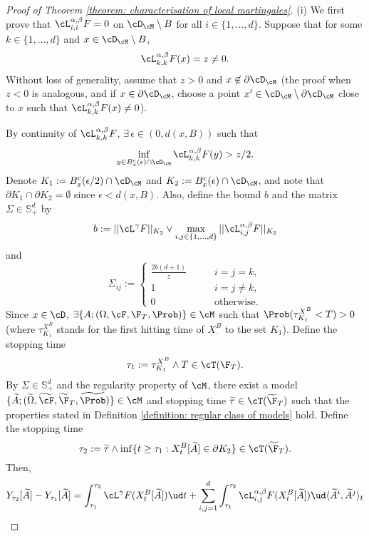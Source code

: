 \documentclass[11pt]{article}
\begin{document}
\begin{proof}[Proof of Theorem \ref{theorem: characterisation of local martingales}]
\item (i) We first prove that $\cL^{\alpha,\beta}_{i,i} F = 0$ on $\cD_{\cM} \setminus B$ for all $i \in \{1,\ldots,d\}$. Suppose that for some $k \in \{1,\ldots,d\}$ and $x \in \cD_{\cM} \setminus B$,
$$
\cL^{\alpha,\beta}_{k,k} F(x) = z \neq 0.
$$
Without loss of generality, assume that $z > 0$ and $x \not\in \partial \cD_\cM$ (the proof when $z < 0$ is analogous, and if $x \in \partial \cD_\cM$, choose a point $x^\prime \in \cD_\cM \setminus \partial \cD_\cM$ close to $x$ such that $\cL^{\alpha,\beta}_{k,k} F(x) \neq 0$).

By continuity of $\cL^{\alpha,\beta}_{k,k} F$, $\exists \, \epsilon \in (0,d(x,B))$ such that
$$
\inf_{y \in B^c_x(\epsilon) \cap \cD_{\cM}} \cL^{\alpha,\beta}_{k,k} F(y) > z/2.
$$
Denote $K_1 := B^c_x(\epsilon/2) \cap \cD_{\cM}$ and $K_2 := B^c_x(\epsilon) \cap \cD_{\cM}$, and note that $\partial K_1 \cap \partial K_2 = \emptyset$ since $\epsilon < d(x,B)$. Also, define the bound $b$ and the matrix $\Sigma \in \mathbb{S}^d_+$ by
$$
b := || \cL^\gamma F ||_{K_2} \vee \max_{i,j \in \{1,\ldots,d\}} || \cL^{\alpha,\beta}_{i,j} F ||_{K_2}
$$
and
$$
\Sigma_{ij} :=
\begin{cases}
\frac{2b(d+1)}{z} \qquad& i = j = k, \\
1 & i = j \neq k, \\
0 & \textrm{otherwise}.
\end{cases}
$$
Since $x \in \cD$, $\exists \{ A ; (\Omega, \cF, \F_T, \Prob) \} \in \cM$ such that $\Prob(\tau^{X^B}_{K_1} < T) > 0$ (where $\tau^{X^B}_{K_1}$ stands for the first hitting time of $X^B_\cdot$ to the set $K_1$). Define the stopping time
$$
\tau_1 := \tau^{X^B}_{K_1} \wedge T \in \cT(\F_T).
$$
By $\Sigma \in \mathbb{S}^d_+$ and the regularity property of $\cM$, there exist a model $\{ \widetilde{A}; (\widetilde{\Omega}, \widetilde{\cF}, \widetilde{\F}_T, \widetilde{\Prob}) \} \in \cM$ and stopping time $\widetilde{\tau} \in \cT(\widetilde{\F}_T)$ such that the properties stated in Definition \ref{definition: regular class of models} hold. Define the stopping time
$$
\tau_2 := \widetilde{\tau} \wedge \inf\{ t \geq \tau_1 : X^B_t[\widetilde{A}] \in \partial K_2 \} \in \cT(\widetilde{\F}_T).
$$
Then,
\begin{align*}
Y_{\tau_2}[\widetilde{A}] - Y_{\tau_1}[\widetilde{A}] &= \int_{\tau_1}^{\tau_2} \cL^\gamma F(X^B_t[\widetilde{A}]) \ud t + \sum_{i,j=1}^d \int_{\tau_1}^{\tau_2} \cL^{\alpha,\beta}_{i,j} F(X^B_t[\widetilde{A}]) \ud \langle \widetilde{A}^i,\widetilde{A}^j \rangle_t \\

\end{align*}
\end{proof}
\end{document}
